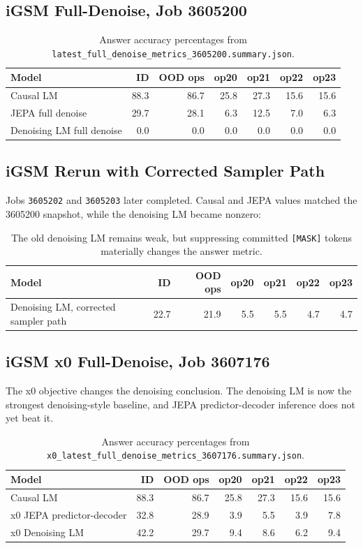 \documentclass[11pt]{article}
\begin{document}
\subsection{iGSM Full-Denoise, Job 3605200}

\begin{table}[h]
\centering
\begin{tabular}{lrrrrrr}
\toprule
Model & ID & OOD ops & op20 & op21 & op22 & op23 \\
\midrule
Causal LM & 88.3 & 86.7 & 25.8 & 27.3 & 15.6 & 15.6 \\
JEPA full denoise & 29.7 & 28.1 & 6.3 & 12.5 & 7.0 & 6.3 \\
Denoising LM full denoise & 0.0 & 0.0 & 0.0 & 0.0 & 0.0 & 0.0 \\
\bottomrule
\end{tabular}
\caption{Answer accuracy percentages from
\texttt{latest\_full\_denoise\_metrics\_3605200.summary.json}.}
\end{table}

\subsection{iGSM Rerun with Corrected Sampler Path}

Jobs \texttt{3605202} and \texttt{3605203} later completed.  Causal and JEPA
values matched the 3605200 snapshot, while the denoising LM became nonzero:
\begin{table}[h]
\centering
\begin{tabular}{lrrrrrr}
\toprule
Model & ID & OOD ops & op20 & op21 & op22 & op23 \\
\midrule
Denoising LM, corrected sampler path & 22.7 & 21.9 & 5.5 & 5.5 & 4.7 & 4.7 \\
\bottomrule
\end{tabular}
\caption{The old denoising LM remains weak, but suppressing committed
\texttt{[MASK]} tokens materially changes the answer metric.}
\end{table}

\subsection{iGSM x0 Full-Denoise, Job 3607176}

The x0 objective changes the denoising conclusion.  The denoising LM is now the
strongest denoising-style baseline, and JEPA predictor-decoder inference does
not yet beat it.
\begin{table}[h]
\centering
\begin{tabular}{lrrrrrr}
\toprule
Model & ID & OOD ops & op20 & op21 & op22 & op23 \\
\midrule
Causal LM & 88.3 & 86.7 & 25.8 & 27.3 & 15.6 & 15.6 \\
x0 JEPA predictor-decoder & 32.8 & 28.9 & 3.9 & 5.5 & 3.9 & 7.8 \\
x0 Denoising LM & 42.2 & 29.7 & 9.4 & 8.6 & 6.2 & 9.4 \\
\bottomrule
\end{tabular}
\caption{Answer accuracy percentages from
\texttt{x0\_latest\_full\_denoise\_metrics\_3607176.summary.json}.}
\end{table}
\end{document}

